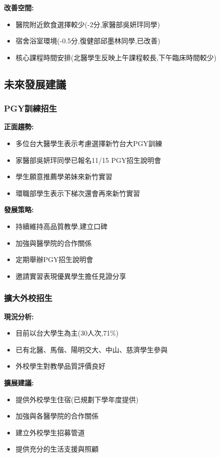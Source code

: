 \documentclass[12pt,a4paper]{article}
\begin{document}
\textbf{改善空間:}
\begin{itemize}[leftmargin=*]
\item 醫院附近飲食選擇較少(-2分,家醫部吳妍玶同學)
\item 宿舍浴室環境(-0.5分,復健部邱墨林同學,已改善)
\item 核心課程時間安排(北醫學生反映上午課程較長,下午臨床時間較少)
\end{itemize}

\subsection{未來發展建議}

\subsubsection{PGY訓練招生}

\textbf{正面趨勢:}
\begin{itemize}[leftmargin=*]
\item 多位台大醫學生表示考慮選擇新竹台大PGY訓練
\item 家醫部吳妍玶同學已報名11/15 PGY招生說明會
\item 學生願意推薦學弟妹來新竹實習
\item 環職部學生表示下梯次還會再來新竹實習
\end{itemize}

\textbf{發展策略:}
\begin{itemize}[leftmargin=*]
\item 持續維持高品質教學,建立口碑
\item 加強與醫學院的合作關係
\item 定期舉辦PGY招生說明會
\item 邀請實習表現優異學生擔任見證分享
\end{itemize}

\subsubsection{擴大外校招生}

\textbf{現況分析:}
\begin{itemize}[leftmargin=*]
\item 目前以台大學生為主(30人次,71\%)
\item 已有北醫、馬偕、陽明交大、中山、慈濟學生參與
\item 外校學生對教學品質評價良好
\end{itemize}

\textbf{擴展建議:}
\begin{itemize}[leftmargin=*]
\item 提供外校學生住宿(已規劃下學年度提供)
\item 加強與各醫學院的合作關係
\item 建立外校學生招募管道
\item 提供充分的生活支援與照顧
\end{itemize}
\end{document}
